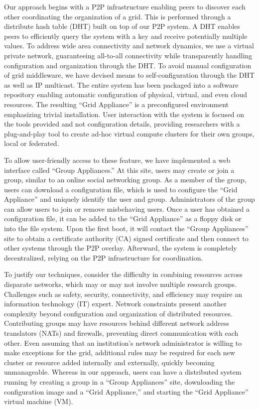 \documentclass[conference]{IEEEtran}
\begin{document}
Our approach begins with a P2P infrastructure enabling peers to discover each
other coordinating the organization of a grid. This is performed through a
distribute hash table (DHT) built on top of our P2P system.  A DHT enables
peers to efficiently query the system with a key and receive potentially
multiple values.  To address wide area connectivity and network dynamics, we
use a virtual private network, guaranteeing all-to-all connectivity while
transparently handling configuration and organization through the DHT.  To
avoid manual configuration of grid middleware, we have devised means to
self-configuration through the DHT as well as IP multicast.  The entire system
has been packaged into a software repository enabling automatic configuration
of physical, virtual, and even cloud resources.  The resulting ``Grid
Appliance'' is a preconfigured environment emphasizing trivial installation.
User interaction with the system is focused on the tools provided and not
configuration details, providing researchers with a plug-and-play tool to
create ad-hoc virtual compute clusters for their own groups, local or
federated.  

To allow user-friendly access to these feature, we have implemented a web
interface called ``Group Appliances.''  At this site, users may create or join
a group, similar to an online social networking group.  As a member of the
group, users can download a configuration file, which is used to configure the
``Grid Appliance'' and uniquely identify the user and group.  Administrators of
the group can allow users to join or remove misbehaving users.  Once a user has
obtained a configuration file, it can be added to the ``Grid Appliance'' as a
floppy disk or into the file system.  Upon the first boot, it will contact the
``Group Appliances'' site to obtain a certificate authority (CA) signed
certificate and then connect to other systems through the P2P overlay.
Afterward, the system is completely decentralized, relying on the P2P
infrastructure for coordination.

To justify our techniques, consider the difficulty in combining resources
across disparate networks, which may or may not involve multiple research
groups.  Challenges such as safety, security, connectivity, and efficiency may
require an information technology (IT) expert.  Network constraints present
another complexity beyond configuration and organization of distributed
resources.  Contributing groups may have resources behind different network
address translators (NATs) and firewalls, preventing direct communication with
each other.  Even assuming that an institution's network administrator is
willing to make exceptions for the grid, additional rules may be required for
each new cluster or resource added internally and externally, quickly becoming
unmanageable.  Whereas in our approach, users can have a distributed system
running by creating a group in a ``Group Appliances'' site, downloading the
configuration image and a ``Grid Appliance,'' and starting the ``Grid
Appliance'' virtual machine (VM).
\end{document}
